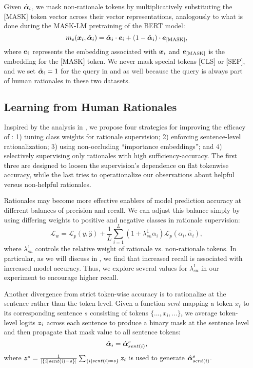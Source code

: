 Given $\hat{\bm{\alpha}}_i$,
we mask non-rationale tokens by multiplicatively substituting the [MASK] token vector across their vector representations, analogously to what is done during the MASK-LM pretraining of the BERT model:
\begingroup\abovedisplayskip=4pt \belowdisplayskip=4pt
$$m_s(\bm{x}_i, \hat{\bm{\alpha}}_i) = \hat{\bm{\alpha}}_i \cdot \bm{e}_i + (1- \hat{\bm{\alpha}}_i) \cdot \bm{e}_{\text{[MASK]}},$$
\endgroup
where $\bm{e}_i$ represents the embedding associated with $\bm{x}_i$ and $\bm{e}_{\text{[MASK]}}$ is the embedding for the [MASK] token.
We never mask special tokens [CLS] or [SEP], and we set $\hat{\bm{\alpha}}_i=1$ for the query in \multirc and \fever as well because the query is always part of human rationales in these two datasets.



\subsection{Learning from Human Rationales}


Inspired by the analysis in , we propose four strategies for improving the efficacy of \learningfromexplanation: 1) tuning class weights for rationale supervision; 2) enforcing sentence-level rationalization; 3) using non-occluding ``importance embeddings''; 
and 4) selectively supervising only rationales with high sufficiency-accuracy. 
The first three are designed to loosen the supervision's dependence on flat tokenwise accuracy, while the last tries to operationalize our observations about helpful versus non-helpful rationales.

Rationales may become more effective enablers of model prediction accuracy at different balances of precision and recall. We can adjust this balance simply by using differing weights to positive and negative classes in rationale supervision:
\begingroup\abovedisplayskip=4pt \belowdisplayskip=4pt
$$\mathcal{L}_w=\mathcal{L}_p(y,\hat{y}) + \frac{1}{L}\sum_{i=1}^L (1 + \lambda_{su}^1\alpha_i) \mathcal{L}_p(\alpha_i, \hat{\alpha}_i),$$
\endgroup
where $\lambda_{su}^1$ controls the relative weight of rationale vs. non-rationale tokens.
In particular, as we will discuss in , we find that 
increased recall is associated with increased model accuracy. Thus, we explore several values for $\lambda_{su}^1$ in our experiment to encourage higher recall.


Another divergence from strict token-wise accuracy is to rationalize at the sentence rather than the token level. 
Given a function $sent$ mapping a token $x_i$ to its corresponding sentence $s$ consisting of tokens $\{...,x_i,...\}$, 
we average token-level logits $\bm{z}_i$ across each sentence to produce a binary mask at the sentence level and then propagate that mask value to all sentence tokens:
\begingroup\abovedisplayskip=4pt \belowdisplayskip=4pt
$$\hat{\bm{\alpha}}_i = \hat{\bm{\alpha}}^{s}_{sent(i)},$$
\endgroup
where $\bm{z}^s = \frac{1}{|\{i | sent(i) = s\}|}\sum_{\{i | sent(i) = s\}}{\bm{z}_i}$ is used to generate $\hat{\bm{\alpha}}^{s}_{sent(i)}$.


